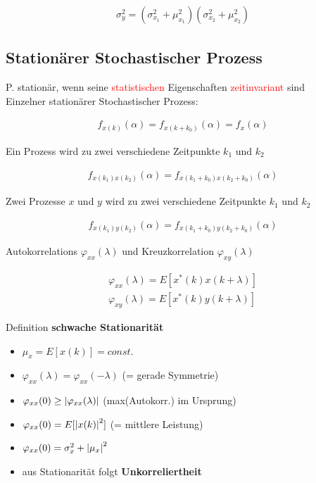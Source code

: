 \documentclass[10pt,a4paper]{article}
\begin{document}
  \begin{mdframed}[style=exercise]
    \begin{align}
        \sigma_y^2 = (\sigma_{x_1}^2+\mu_{x_1}^2)(\sigma_{x_2}^2+\mu_{x_2}^2) 
    \end{align}
  \end{mdframed}
\subsection{Stationärer Stochastischer Prozess}
P. stationär, wenn seine \textcolor{red}{statistischen} Eigenschaften \textcolor{red}{zeitinvariant} sind \\
Einzelner stationärer Stochastischer Prozess:
  \begin{mdframed}[style=exercise]
    \begin{align}
        f_{x(k)}(\alpha) = f_{x(k+k_0)}(\alpha) = f_x(\alpha)
    \end{align}
  \end{mdframed}
Ein Prozess wird zu zwei verschiedene Zeitpunkte $k_1$ und $k_2$
  \begin{mdframed}[style=exercise]
    \begin{align}
        f_{x(k_1)x(k_2)}(\alpha) = f_{x(k_1+k_0)x(k_2+k_0)}(\alpha)
    \end{align}
  \end{mdframed}
Zwei Prozesse $x$ und $y$ wird zu zwei verschiedene Zeitpunkte $k_1$ und $k_2$
\begin{mdframed}[style=exercise]
    \begin{align}
        f_{x(k_1)y(k_2)}(\alpha) = f_{x(k_1+k_0)y(k_2+k_0)}(\alpha)
    \end{align}
  \end{mdframed}
Autokorrelations $\varphi_{xx}(\lambda)$ und Kreuzkorrelation $\varphi_{xy}(\lambda)$
\begin{mdframed}[style=exercise]
    \begin{align}
        \varphi_{xx}(\lambda) = E[x^*(k)x(k+\lambda)] \\
        \varphi_{xy}(\lambda) =E[x^*(k)y(k+\lambda)]
    \end{align}
  \end{mdframed}
Definition \textbf{schwache Stationarität}
\begin{itemize}
    \item $\mu_x = E[x(k)] = const.$
    \item $\varphi_{xx}(\lambda) = \varphi_{xx}(-\lambda)$ (= gerade Symmetrie)
    \item $\varphi_{xx}(0) \geq \abs{\varphi_{xx}(\lambda)}$ (max(Autokorr.) im Ursprung)
    \item $\varphi_{xx}(0) =E[\abs{x(k)}^2]$ (= mittlere Leistung)
    \item $\varphi_{xx}(0) = \sigma_x^2 + \abs{\mu_x}^2$
    \item aus Stationarität folgt \textbf{Unkorreliertheit}
\end{itemize}
\end{document}
